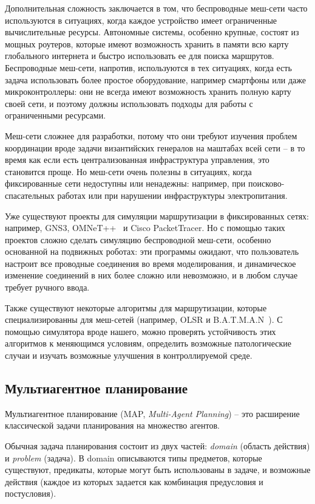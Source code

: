 \documentclass[%
]{report}
\begin{document}
Дополнительная сложность заключается в том, что
беспроводные меш-сети часто используются в ситуациях,
когда каждое устройство имеет ограниченные вычислительные ресурсы.
Автономные системы, особенно крупные,
состоят из мощных роутеров,
которые имеют возможность хранить в памяти всю карту глобального интернета
и быстро использовать ее для поиска маршрутов.
Беспроводные меш-сети, напротив, используются в тех ситуациях,
когда есть задача использовать более простое оборудование,
например смартфоны или даже микроконтроллеры:
они не всегда имеют возможность хранить полную карту своей сети,
и поэтому должны использовать подходы для работы с ограниченными ресурсами.

Меш-сети сложнее для разработки, потому что они требуют
изучения проблем координации вроде задачи византийских генералов на маштабах всей сети --
в то время как если есть централизованная инфраструктура управления, это становится проще.
Но меш-сети очень полезны в ситуациях, когда фиксированные сети недоступны или ненадежны:
например, при поисково-спасательных работах или при нарушении инфраструктуры электропитания.

Уже существуют проекты для симуляции маршрутизации в фиксированных сетях:
например, GNS3, OMNeT++~\cite{9181563} и Cisco PacketTracer.
Но с помощью таких проектов сложно сделать симуляцию беспроводной меш-сети,
особенно основанной на подвижных роботах:
эти программы ожидают, что пользователь настроит все проводные соединения
во время моделирования,
и динамическое изменение соединений в них более сложно или невозможно,
и в любом случае требует ручного ввода.

Также существуют некоторые алгоритмы для маршрутизации,
которые специализированны для меш-сетей
(например, OLSR и B.A.T.M.A.N~\cite{DBLP:journals/corr/abs-1901-02298}).
С помощью симулятора вроде нашего, можно проверять устойчивость этих алгоритмов к меняющимся условиям,
определить возможные патологические случаи
и изучать возможные улучшения
в контроллируемой среде.

\subsection{Мультиагентное планирование}

Мультиагентное планирование (MAP, \emph{Multi-Agent Planning}) --
это расширение классической задачи планирования
на множество агентов.

Обычная задача планирования состоит из двух частей:
\emph{domain} (область действия) и \emph{problem} (задача).
В domain описываются типы предметов, которые существуют,
предикаты, которые могут быть использованы в задаче,
и возможные действия (каждое из которых задается как комбинация предусловия и постусловия).
\end{document}
